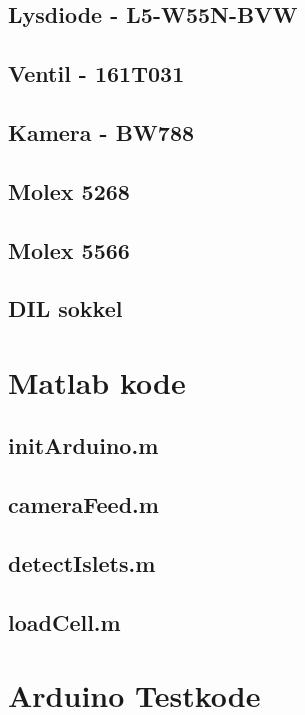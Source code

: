 \subsection{Lysdiode - L5-W55N-BVW}
\label{bilag:L5-W55N-BVW}

\subsection{Ventil - 161T031}
\label{bilag:ventil}

\subsection{Kamera - BW788}

\subsection{Molex 5268}

\subsection{Molex 5566}


\subsection{DIL sokkel}

\section{Matlab kode}
\subsection{initArduino.m} 
\label{bilag:initArduino}
\subsection{cameraFeed.m} 
\label{bilag:cameraFeed}
\subsection{detectIslets.m}
\subsection{loadCell.m}
\newpage
\section{Arduino Testkode}

